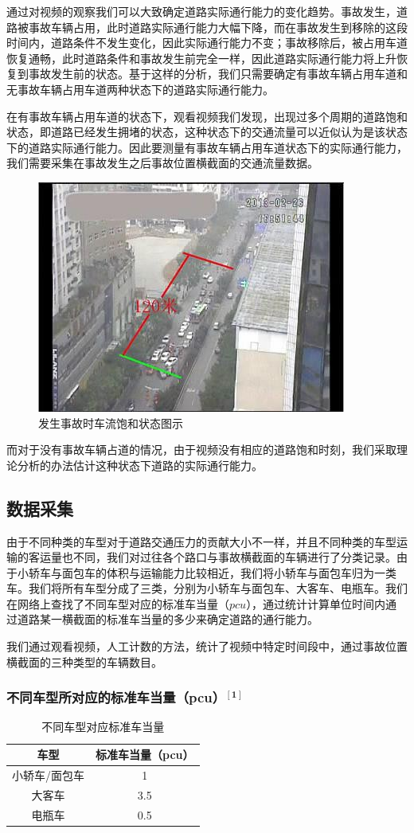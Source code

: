 \documentclass{cumcmart}
\begin{document}
通过对视频的观察我们可以大致确定道路实际通行能力的变化趋势。事故发生，道路被事故车辆占用，此时道路实际通行能力大幅下降，而在事故发生到移除的这段时间内，道路条件不发生变化，因此实际通行能力不变；事故移除后，被占用车道恢复通畅，此时道路条件和事故发生前完全一样，因此道路实际通行能力将上升恢复到事故发生前的状态。基于这样的分析，我们只需要确定有事故车辆占用车道和无事故车辆占用车道两种状态下的道路实际通行能力。

在有事故车辆占用车道的状态下，观看视频我们发现，出现过多个周期的道路饱和状态，即道路已经发生拥堵的状态，这种状态下的交通流量可以近似认为是该状态下的道路实际通行能力。因此要测量有事故车辆占用车道状态下的实际通行能力，我们需要采集在事故发生之后事故位置横截面的交通流量数据。
\begin{figure}
\centering
\includegraphics[width=.6\textwidth]{fig1}
\caption{发生事故时车流饱和状态图示}
\end{figure}


而对于没有事故车辆占道的情况，由于视频没有相应的道路饱和时刻，我们采取理论分析的办法估计这种状态下道路的实际通行能力。


\subsection{数据采集}
由于不同种类的车型对于道路交通压力的贡献大小不一样，并且不同种类的车型运输的客运量也不同，我们对过往各个路口与事故横截面的车辆进行了分类记录。由于小轿车与面包车的体积与运输能力比较相近，我们将小轿车与面包车归为一类车。我们将所有车型分成了三类，分别为小轿车与面包车、大客车、电瓶车。我们在网络上查找了不同车型对应的标准车当量（$ {pcu}$），通过统计计算单位时间内通过道路某一横截面的标准车当量的多少来确定道路的通行能力。

我们通过观看视频，人工计数的方法，统计了视频中特定时间段中，通过事故位置横截面的三种类型的车辆数目。

\subsubsection{不同车型所对应的标准车当量（pcu）$^{\mathbf{[1]}}$}
\begin{table}[h]
\centering
\begin{tabular}{|c|c|}
\hline
\bf 车型&\bf 标准车当量（pcu） \\
\hline
小轿车/面包车&
1 \\
\hline
大客车&
3.5 \\
\hline
电瓶车&
0.5 \\
\hline
\end{tabular}
\caption{ 不同车型对应标准车当量}
\end{table}
\end{document}
